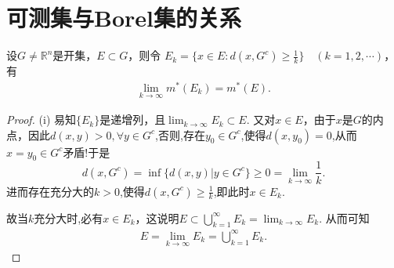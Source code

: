 \documentclass[../../main.tex]{subfiles}%
\begin{document}
\section{可测集与Borel集的关系}

\begin{lemma}[Carathéodory引理]\label{lemma:卡拉西奥多里引理}
设$G\neq\mathbb{R}^n$是开集，$E\subset G$，则令
$E_k = \{x\in E:d(x,G^c)\geqslant \frac{1}{k}\}\quad (k = 1,2,\cdots)$，
有
\begin{align*}
\lim_{k\to\infty}m^*(E_k)=m^*(E).
\end{align*}
\end{lemma}
\begin{proof}
(i) 易知$\{E_k\}$是递增列，且$\lim_{k\to\infty}E_k\subset E$. 又对$x\in E$，由于$x$是$G$的内点，因此$d(x,y)>0,\forall y\in G^c$,否则,存在$y_0\in G^c$,使得$d(x,y_0)=0$,从而$x=y_0\in G^c$矛盾!于是$$d(x,G^c)=\inf\{d(x,y)|y\in G^c\} \geqslant  0=\lim_{k\to \infty}\frac{1}{k}.$$
进而存在充分大的$k>0$,使得$d(x,G^c)\geqslant \frac{1}{k}$,即此时$x\in E_k$.

故当$k$充分大时,必有$x\in E_k$，这说明$E\subset\bigcup_{k = 1}^{\infty}E_k=\lim_{k\to\infty}E_k$. 从而可知
\begin{align*}
E=\lim_{k\to\infty}E_k=\bigcup_{k = 1}^{\infty}E_k.
\end{align*}


\end{proof}
\end{document}
